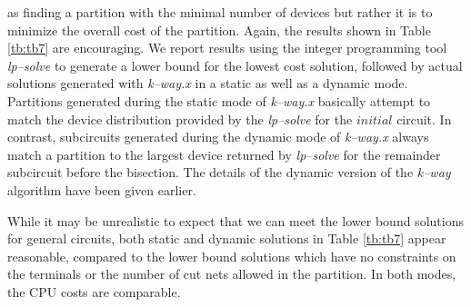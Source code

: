 as finding a partition with the minimal number of devices but rather it 
is to minimize the overall cost of the partition.
Again, the results shown in Table \ref{tb:tb7} are encouraging.
We report results using the integer programming tool {\em lp--solve} to 
generate a lower bound for the lowest cost solution, followed by actual 
solutions generated with {\em k--way.x} in a static as well as a dynamic 
mode.
Partitions generated during the static mode of {\em k--way.x} basically 
attempt to match the device distribution provided by the {\em lp--solve} 
for the $initial$ circuit.
In contrast, subcircuits generated during the dynamic mode of
{\em k--way.x} always match a partition to the largest device returned by
{\em lp--solve} for the remainder subcircuit before the bisection.
The details of the dynamic version of the {\em k--way} algorithm have 
been given earlier.
\par
While it may be unrealistic to expect that we can meet the lower bound 
solutions for general circuits, both static and dynamic solutions in 
Table \ref{tb:tb7} appear reasonable, compared to the lower bound solutions
which have no constraints on the terminals or the number of cut nets allowed 
in the partition.
In both modes, the CPU costs are comparable.













